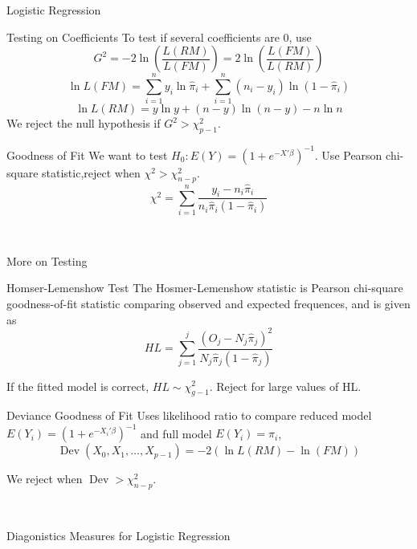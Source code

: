 \documentclass{article}
\DeclareMathOperator{\dev}{Dev}
\begin{document}
\begin{multicols*}{3}
\begin{blackbox}{Logistic Regression}
\begin{brownbox}{Testing on Coefficients}
                To test if several coefficients are 0, use\\[-2ex]
                \[G^2 = -2\ln \left(\frac{L(RM)}{L(FM)}\right) = 2\ln \left(\frac{L(FM)}{L(RM)}\right)\]
                \vspace{-2ex}
                \[\ln L(FM) =\sum_{i=1}^n y_i\ln \hat{\pi}_i + \sum_{i=1}^n (n_i-y_i)\ln(1-\hat{\pi}_i)\]
                \[\ln L(RM) = y\ln y + (n-y)\ln(n-y) - n\ln n\]
                We reject the null hypothesis if $G^2 > \chi^2_{p-1}$. 
            \end{brownbox}
            \begin{pinkbox}{Goodness of Fit}
                We want to test $H_0: E(Y) = \left(1 + e^{-X'\beta}\right)^{-1}$. Use Pearson chi-square statistic,reject when $\chi^2 > \chi^2_{n-p}$.\\
                \[\chi^2 = \sum_{i=1}^n \frac{y_i-n_i\hat{\pi}_i}{n_i\hat{\pi}_i(1-\hat{\pi}_i)}\]
                
            \end{pinkbox}\\[-2ex]
        \end{blackbox}
        \begin{blackbox}{More on Testing}
            \begin{redbox}{Homser-Lemenshow Test}
                The Hosmer-Lemenshow statistic is Pearson chi-square goodness-of-fit statistic comparing observed and
                expected frequences, and is given as\\[-3ex]
                \[HL = \sum_{j=1}^j \frac{(O_j - N_j\hat{\pi}_j)^2}{N_j\hat{\pi}_j(1-\hat{\pi}_j)}\]
                \vspace{-2ex}

                If the fitted model is correct, $HL \sim \chi^2_{g-1}$. Reject for large values of HL.
            \end{redbox}
            \begin{pinkbox}{Deviance Goodness of Fit}
                Uses likelihood ratio to compare reduced model $E(Y_i) = \left(1 + e^{-X_i'\beta}\right)^{-1}$ and full model $E(Y_i) = \pi_i$, \\[-2ex]
                \[\dev(X_0, X_1, \ldots, X_{p-1}) = -2 (\ln L(RM) - \ln(FM))\]
                \vspace{-3ex}

                We reject when $\dev > \chi^2_{n-p}$.
            \end{pinkbox}\\[-2ex]
        \end{blackbox}
        \begin{blackbox}{Diagonistics Measures for Logistic Regression}


\end{blackbox}
\end{multicols*}
\end{document}
